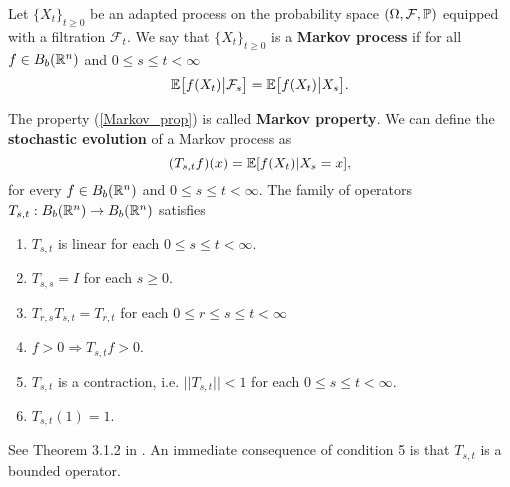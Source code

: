 \begin{Definition}
 Let $\{X_t\}_{t \ge 0}$  be an adapted process on the probability space $(\Omega,\mathcal{F},\mathbb{P})$ equipped with a filtration $\mathcal{F}_t$.
 We say that $\{X_t\}_{t \ge 0}$ is a \textbf{Markov process} if for all $f\in B_b(\mathbb{R}^n)$
 and $0\leq s \leq t < \infty$
 \begin{equation} \label{Markov_prop}
  \mathbb{E} \bigl[ f(X_t) \big| \mathcal{F}_s \bigr] = \mathbb{E} \bigl[ f(X_t) \big| X_s \bigr].
 \end{equation}
\end{Definition}
The property (\ref{Markov_prop}) is called \textbf{Markov property}.
We can define the \textbf{stochastic evolution} of a Markov process as 
\begin{equation}\label{stoch_evolution}
 (T_{s,t}f)(x) = \mathbb{E}[f(X_t) |X_s = x],
\end{equation}
for every $f \in B_b(\mathbb{R}^n)$ and $0\leq s \leq t < \infty$.
The family of operators $T_{s,t} : B_b(\mathbb{R}^n) \to B_b(\mathbb{R}^n)$ satisfies  
\begin{enumerate}
 \item $T_{s,t}$ is linear for each $0\leq s \leq t < \infty$.
 \item $ T_{s,s} = I $ for each $s \geq 0$.
 \item $T_{r,s} T_{s,t} = T_{r,t}$ for each $0\leq r \leq s \leq t < \infty$
 \item $f>0 \Rightarrow T_{s,t}f >0$.
 \item $T_{s,t}$ is a contraction, i.e. $||T_{s,t}||<1$ for each $0\leq s \leq t < \infty$.
 \item $T_{s,t} (1) = 1$.
\end{enumerate}
See Theorem 3.1.2 in \cite{Applebaum}. An immediate consequence of condition 5 is that $T_{s,t}$ is a bounded operator.

